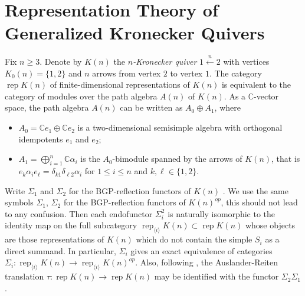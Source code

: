 \documentclass{amsart}
\numberwithin{equation}{section}
\newcommand{\CC}{\mathbb{C}}
\newcommand{\rep}{\operatorname{rep}}
\begin{document}
\section{Representation Theory of Generalized Kronecker Quivers}
\label{sec:RepK(n)}

\noindent Fix $n\ge3$. Denote by $K(n)$ the \emph{$n$-Kronecker quiver} $1\stackrel{n}{\longleftarrow}2$ with vertices $K_0(n)=\{1,2\}$ and $n$ arrows from vertex $2$ to vertex $1$. 
The category $\rep K(n)$ of finite-dimensional representations of $K(n)$ is equivalent to the category of modules over the path algebra $A(n)$ of $K(n)$.
As a $\CC$-vector space, the path algebra $A(n)$ can be written as $A_0\oplus A_1$, where 
\begin{itemize}
  \item $A_0=\CC e_1\oplus \CC e_2$ is a two-dimensional semisimple algebra with orthogonal idempotents $e_1$ and $e_2$;
  \item $A_1=\bigoplus_{i=1}^n \CC\alpha_i$ is the $A_0$-bimodule spanned by the arrows of $K(n)$, that is $e_k\alpha_ie_\ell=\delta_{k1}\delta_{\ell2}\alpha_i$ for $1\le i\le n$ and $k,\ell\in\{1,2\}$.
\end{itemize}

Write $\Sigma_1$ and $\Sigma_2$ for the BGP-reflection functors of $K(n)$ \cite{bgp}. 
We use the same symbols $\Sigma_1$, $\Sigma_2$ for the BGP-reflection functors of $K(n)^{op}$, this should not lead to any confusion. 
Then each endofunctor $\Sigma_i^2$ is naturally isomorphic to the identity map on the full subcategory $\rep_{\langle i\rangle} K(n)\subset \rep K(n)$ whose objects are those representations of $K(n)$ which do not contain the simple $S_i$ as a direct summand.
In particular, $\Sigma_i$ gives an exact equivalence of categories $\Sigma_i:\rep_{\langle i\rangle} K(n)\to\rep_{\langle i\rangle} K(n)^{op}$.
Also, following \cite{brenner-butler}, the Auslander-Reiten translation $\tau:\rep K(n)\to\rep K(n)$ may be identified with the functor $\Sigma_2\Sigma_1$.
\end{document}
